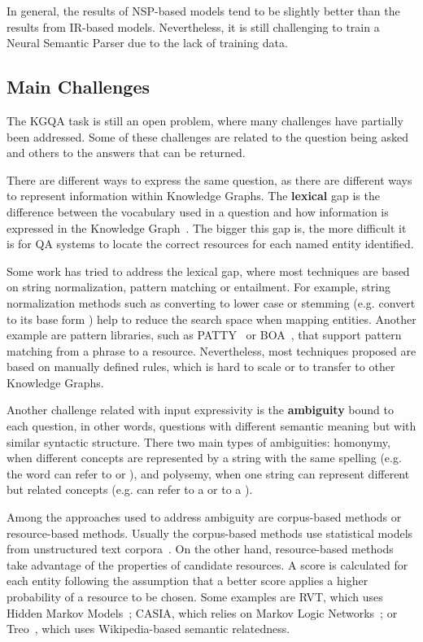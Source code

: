 In general, the results of NSP-based models tend to be slightly better than the results from 
IR-based models. Nevertheless, it is still challenging to train a Neural Semantic Parser due to 
the lack of training data.

\subsection{Main Challenges}
\label{cap2:theoFrame/qakg/challenges}
The KGQA task is still an open problem, where many challenges have partially been addressed. 
Some of these challenges are related to the question being asked and others to the answers that 
can be returned. 

There are different ways to express the same question, as there are different ways to represent 
information within Knowledge Graphs. The \textbf{lexical} gap is the difference between the 
vocabulary used in a question and how information is expressed in the Knowledge 
Graph~\cite{semPar:lexical-gap-HakimovUWC15}. The bigger this gap is, the more difficult it is 
for QA systems to locate the correct resources for each named entity identified. 

Some work has tried to address the lexical gap, where most techniques are based on string 
normalization, pattern matching or entailment. For example, string normalization methods such 
as converting to lower case or stemming (e.g. convert  to its base form 
) help to reduce the search space when mapping entities. Another example are 
pattern libraries, such as PATTY~\cite{qa:NakasholeWS12} or BOA~\cite{qa:GerberN12}, that 
support pattern matching from a phrase to a resource. Nevertheless, most techniques proposed 
are based on manually defined rules, which is hard to scale or to transfer to other Knowledge 
Graphs.

Another challenge related with input expressivity is the \textbf{ambiguity} bound to each 
question, in other words, questions with different semantic meaning but with similar syntactic 
structure. There two main types of ambiguities: homonymy, when different concepts are 
represented by a string with the same spelling (e.g. the word  can refer to 
 or ), and polysemy, when one string can 
represent different but related concepts (e.g.  can refer to a 
 or to a ). 

Among the approaches used to address ambiguity are corpus-based methods or resource-based 
methods. Usually the corpus-based methods use statistical models from unstructured text 
corpora~\cite{qa:shirai1997,qa:ShenYYJLC11}. On the other hand, resource-based methods take 
advantage of the \RDF{} properties of candidate resources. A score is calculated for each entity 
following the assumption that a better score applies a higher probability of a resource to be 
chosen. Some examples are RVT, which uses Hidden Markov Models~\cite{qa:GiannoneBB13}; CASIA, 
which relies on Markov Logic Networks~\cite{qa:shizhu2014casia}; or Treo~\cite{qa:freitas2011treo,
qa:FreitasOOSC13}, which uses Wikipedia-based semantic relatedness.

